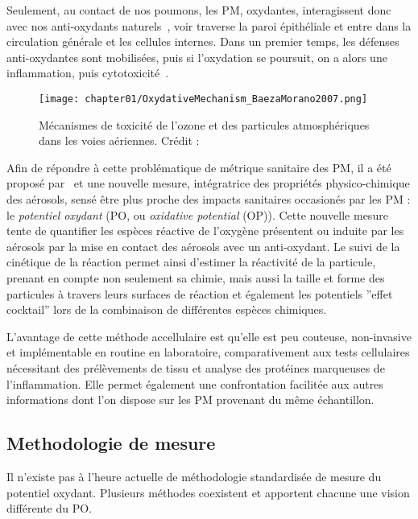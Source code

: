 Seulement, au contact de nos poumons, les PM, oxydantes, interagissent donc avec nos
anti-oxydants naturels~\autocite{kellyProtein2003}, voir traverse la paroi épithéliale
et entre dans la circulation générale et les cellules internes.
Dans un premier temps, les défenses anti-oxydantes sont mobilisées, puis si l'oxydation se
poursuit, on a alors une inflammation, puis cytotoxicité~\autocite{baezaPollution2007}.

\begin{figure}[ht]
    \centering
    \texttt{[image: chapter01/OxydativeMechanism\_BaezaMorano2007.png]}
    \caption{Mécanismes de toxicité de l’ozone et des particules atmosphériques dans les voies
    aériennes. Crédit : \textcite[figure 1]{baezaPollution2007}}%
    \label{fig:mecanisme_oxydation}
\end{figure}

Afin de répondre à cette problématique de métrique sanitaire des PM, il a été proposé
par~\textcite{zielinskiModeling1999} et \textcite{choRedox2005} une nouvelle mesure,
intégratrice des propriétés physico-chimique des aérosols, sensé être plus proche des
impacts sanitaires occasionés par les PM : le \textit{potentiel oxydant} (PO, ou
\textit{oxidative potential} (OP)).
Cette nouvelle mesure tente de quantifier les espèces réactive de l'oxygène présentent
ou induite par les aérosols par la mise en contact des aérosols avec un anti-oxydant.
Le suivi de la cinétique de la réaction permet ainsi d'estimer la réactivité de la
particule, prenant en compte non seulement sa chimie, mais aussi la taille et forme des
particules à travers leurs surfaces de réaction et également les potentiels ''effet
cocktail'' lors de la combinaison de différentes espèces chimiques.

L'avantage de cette méthode accellulaire est qu'elle est peu couteuse, non-invasive et
implémentable en routine en laboratoire, comparativement aux tests cellulaires nécessitant
des prélèvements de tissu et analyse des protéines marqueuses de l'inflammation.
Elle permet également une confrontation facilitée aux autres informations dont l'on dispose
sur les PM provenant du même échantillon.

\subsection{Methodologie de mesure}%
\label{sub:methodologie_de_mesure}

Il n'existe pas à l'heure actuelle de méthodologie standardisée de mesure du potentiel
oxydant. Plusieurs méthodes coexistent et apportent chacune une vision différente du PO.

